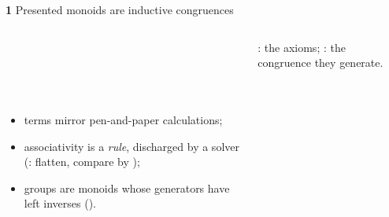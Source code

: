\begin{frame}{\textbf{1}\; Presented monoids are inductive congruences}
\begin{columns}[c]
\begin{column}{0.42\textwidth}
\begin{code}[hide]
\AgdaSymbol{)}\AgdaSpace{}%
\<%
\\
%
\\[\AgdaEmptyExtraSkip]%
\>[0]\<%
\\
\>[0][@{}l@{\AgdaIndent{0}}]%
\>[2]\AgdaSpace{}%
\AgdaSpace{}%
\AgdaSpace{}%
\AgdaSpace{}%
\AgdaSpace{}%
\AgdaSymbol{:}\AgdaSpace{}%
\AgdaSpace{}%
\<%
\\
%
\>[2]\AgdaOperator{\AgdaPostulate{\AgdaUnderscore{}===\AgdaUnderscore{}}}%
\>[14]\AgdaSymbol{:}\AgdaSpace{}%
\AgdaSpace{}%
\<%
\end{code}
\vspace{2pt}
\footnotesize
\begin{itemize}
  \item terms mirror pen-and-paper calculations;
  \item associativity is a \emph{rule}, discharged by a solver
        (: flatten, compare by );
  \item groups are monoids whose generators have left inverses
        ().
\end{itemize}
\end{column}
\begin{column}{0.54\textwidth}
{\small \aid{\_===\_}: the axioms; : the congruence they generate.}
\renewcommand{\AgdaCodeStyle}{\footnotesize}
\begin{code}%
\>[0]\AgdaSpace{}%
\AgdaSpace{}%
\AgdaSymbol{:}\AgdaSpace{}%
\AgdaSpace{}%
\AgdaSpace{}%
\<%
\\
\>[0][@{}l@{\AgdaIndent{0}}]%
\>[2]%
\>[8]\AgdaSymbol{:}\AgdaSpace{}%
\AgdaSpace{}%
\AgdaSpace{}%
\<%
\\
%
\>[2]%
\>[8]\AgdaSymbol{:}\AgdaSpace{}%
\AgdaSpace{}%
\AgdaSpace{}%
\AgdaSpace{}%
\AgdaSpace{}%
\AgdaSpace{}%
\AgdaSpace{}%
\<%
\\
%
\>[2]\AgdaSpace{}%
\AgdaSymbol{:}\AgdaSpace{}%
\AgdaSpace{}%

\end{code}
\end{column}
\end{columns}
\end{frame}
